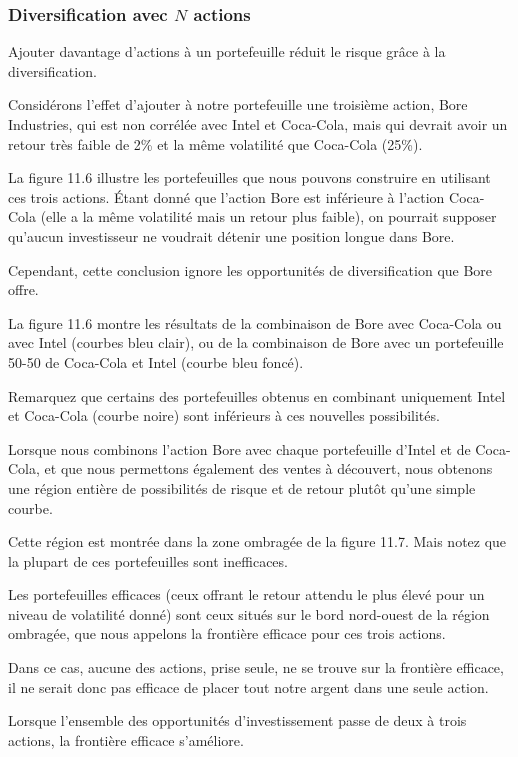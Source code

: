 \documentclass[a4paper, 12pt]{report}
\begin{document}
\subsubsection{Diversification avec $N$ actions}

Ajouter davantage d'actions à un portefeuille réduit le risque grâce à la diversification.

Considérons l'effet d'ajouter à notre portefeuille une troisième action, Bore Industries, qui est non corrélée avec Intel et Coca-Cola, mais qui devrait avoir un retour très faible de 2\% et la même volatilité que Coca-Cola (25\%).

La figure 11.6 illustre les portefeuilles que nous pouvons construire en utilisant ces trois actions. Étant donné que l'action Bore est inférieure à l'action Coca-Cola (elle a la même volatilité mais un retour plus faible), on pourrait supposer qu'aucun investisseur ne voudrait détenir une position longue dans Bore.

Cependant, cette conclusion ignore les opportunités de diversification que Bore offre.

La figure 11.6 montre les résultats de la combinaison de Bore avec Coca-Cola ou avec Intel (courbes bleu clair), ou de la combinaison de Bore avec un portefeuille 50-50 de Coca-Cola et Intel (courbe bleu foncé).

Remarquez que certains des portefeuilles obtenus en combinant uniquement Intel et Coca-Cola (courbe noire) sont inférieurs à ces nouvelles possibilités.


Lorsque nous combinons l'action Bore avec chaque portefeuille d'Intel et de Coca-Cola, et que nous permettons également des ventes à découvert, nous obtenons une région entière de possibilités de risque et de retour plutôt qu'une simple courbe.

Cette région est montrée dans la zone ombragée de la figure 11.7. Mais notez que la plupart de ces portefeuilles sont inefficaces.

Les portefeuilles efficaces (ceux offrant le retour attendu le plus élevé pour un niveau de volatilité donné) sont ceux situés sur le bord nord-ouest de la région ombragée, que nous appelons la frontière efficace pour ces trois actions.

Dans ce cas, aucune des actions, prise seule, ne se trouve sur la frontière efficace, il ne serait donc pas efficace de placer tout notre argent dans une seule action.

Lorsque l'ensemble des opportunités d'investissement passe de deux à trois actions, la frontière efficace s'améliore.
\end{document}
